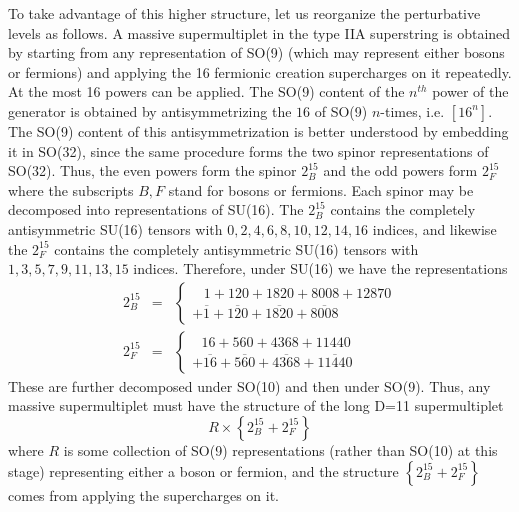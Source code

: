 To take advantage of this higher structure, let us reorganize the
perturbative levels as follows. A massive supermultiplet in the type IIA
superstring is obtained by starting from any representation of SO(9) (which
may represent either bosons or fermions) and applying the 16 fermionic
creation supercharges on it repeatedly. At the most 16 powers can be
applied. The SO(9) content of the $n^{th}$ power of the generator is
obtained by antisymmetrizing the $16$ of SO(9) $n$-times, i.e. $\left[
16^n\right] $. The SO(9) content of this antisymmetrization is better
understood by embedding it in SO(32), since the same procedure forms the two
spinor representations of SO(32). Thus, the even powers form the spinor $%
2_B^{15}$ and the odd powers form $2_F^{15}$ where the subscripts $B,F$
stand for bosons or fermions. Each spinor may be decomposed into
representations of SU(16). The $2_B^{15}$ contains the completely
antisymmetric SU(16) tensors with $0,2,4,6,8,10,12,14,16$ indices, and
likewise the $2_F^{15}$ contains the completely antisymmetric SU(16) tensors
with $1,3,5,7,9,11,13,15$ indices. Therefore, under SU(16) we have the
representations
\begin{eqnarray}
2_B^{15} &=&\left\{
\begin{array}{l}
\,\,\,\,\,1+120+1820+8008+12870 \\
+\overline{1}+\overline{120}+\overline{1820}+\overline{8008}
\end{array}
\right. \\
2_F^{15} &=&\left\{
\begin{array}{c}
\,\,\,\,16+560+4368+11440 \\
+\overline{16}+\overline{560}+\overline{4368}+\overline{11440}
\end{array}
\right.  \nonumber
\end{eqnarray}
These are further decomposed under SO(10) and then under SO(9)\cite
{ibmembrane}. Thus, any massive supermultiplet must have the structure of
the long D=11 supermultiplet
\begin{equation}
R\times \left\{ 2_B^{15}+2_F^{15}\right\}  \label{long}
\end{equation}
where $R$ is some collection of SO(9) representations (rather than SO(10) at
this stage) representing either a boson or fermion, and the structure $%
\left\{ 2_B^{15}+2_F^{15}\right\} $ comes from applying the supercharges on
it.


